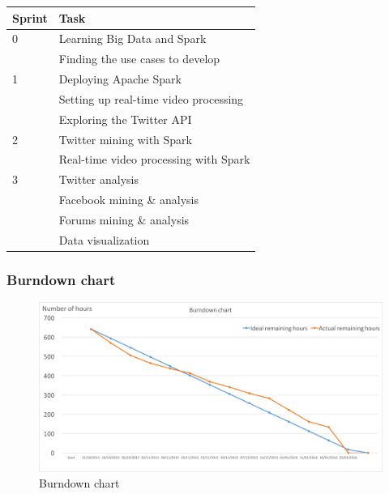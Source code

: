 \documentclass[11pt]{article}
\begin{document}
\begin{center}
\begin{tabular}{|l|l|}
  \hline
  Sprint & Task\\
  \hline
  0 & Learning Big Data and Spark \\
    & Finding the use cases to develop \\ \hline
  1 & Deploying Apache Spark \\
    & Setting up real-time video processing \\
    & Exploring the Twitter API \\ \hline
  2 & Twitter mining with Spark \\
    & Real-time video processing with Spark \\ \hline
  3 & Twitter analysis \\
    & Facebook mining \& analysis \\
    & Forums mining \& analysis \\
    & Data visualization \\
  \hline
\end{tabular}
\end{center}

\vspace{15pt}
\subsubsection{Burndown chart}

\begin{figure}[h!]
    \centering
    \includegraphics[scale=0.5]{img/burndown.png}
    \caption{Burndown chart}
    \label{burndown}
\end{figure}
\end{document}
